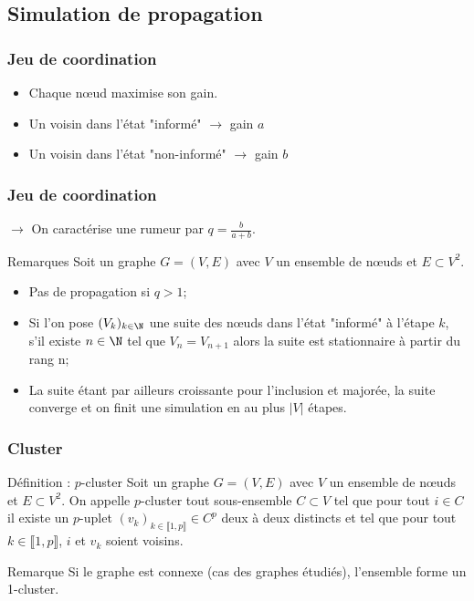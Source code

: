 \documentclass{beamer}
\begin{document}
\subsection{Simulation de propagation}
\begin{frame}
  \frametitle{Jeu de coordination}
  \begin{itemize}
    \item<2-> Chaque nœud maximise son gain.
    \item<3-> Un voisin dans l'état "informé" $\rightarrow$ gain $a$
    \item<3-> Un voisin dans l'état "non-informé" $\rightarrow$ gain $b$
  \end{itemize}

\end{frame}

\begin{frame}
  \frametitle{Jeu de coordination}
  $\rightarrow$ On caractérise une rumeur par $q = \frac{b}{a+b}$.
  \begin{block}{Remarques}
    Soit un graphe $G = (V, E)$ avec $V$ un ensemble de nœuds et $E \subset V^2$.
    \begin{itemize}
      \item<1-> Pas de propagation si $q>1$;
      \item<2-> Si l'on pose $(V_k)_{k\in\N}$ une suite des nœuds dans l'état "informé" à l'étape $k$, s'il existe $n\in\N$ tel que $V_n = V_{n+1}$ alors la suite est stationnaire à partir du rang n;
      \item<3-> La suite étant par ailleurs croissante pour l'inclusion et majorée, la suite converge et on finit une simulation en au plus $|V|$ étapes.
    \end{itemize}
  \end{block}
\end{frame}

\begin{frame}
  \frametitle{Cluster}
  \begin{block}{Définition : $p$-cluster}
    Soit un graphe $G = (V, E)$ avec $V$ un ensemble de nœuds et $E \subset V^2$. On appelle $p$-cluster tout sous-ensemble $C \subset V$ tel que pour tout $i\in C$ il existe un $p$-uplet $(v_k)_{k\in \llbracket1,p\rrbracket} \in C^p$ deux à deux distincts et tel que pour tout $k\in \llbracket1,p\rrbracket$, $i$ et $v_k$ soient voisins.
  \end{block}
  \begin{block}{Remarque}
    Si le graphe est connexe (cas des graphes étudiés), l'ensemble forme un 1-cluster.
  \end{block}
\end{frame}
\end{document}

